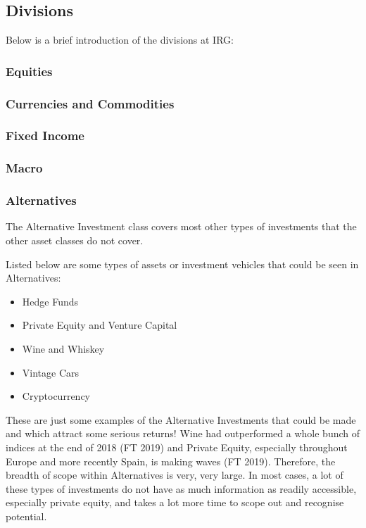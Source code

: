 \documentclass[a4paper]{article}
\begin{document}
{\subsection{Divisions}
Below is a brief introduction of the divisions at IRG:

\subsubsection{Equities}

\subsubsection{Currencies and Commodities}

\subsubsection{Fixed Income}

\subsubsection{Macro}

\subsubsection{Alternatives}
The Alternative Investment class covers most other types of investments that the other asset classes do not cover.

\vspace{10pt}
\noindent Listed below are some types of assets or investment vehicles that could be seen in Alternatives:
\begin{itemize}
	\item Hedge Funds
	\item Private Equity and Venture Capital
	\item Wine and Whiskey
	\item Vintage Cars
	\item Cryptocurrency
\end{itemize}
These are just some examples of the Alternative Investments that could be made and which attract some serious returns! Wine had outperformed a whole bunch of indices at the end of 2018 (FT 2019) and Private Equity, especially throughout Europe and more recently Spain, is making waves (FT 2019). Therefore, the breadth of scope within Alternatives is very, very large. In most cases, a lot of these types of investments do not have as much information as readily accessible, especially private equity, and takes a lot more time to scope out and recognise potential.

}
\end{document}
